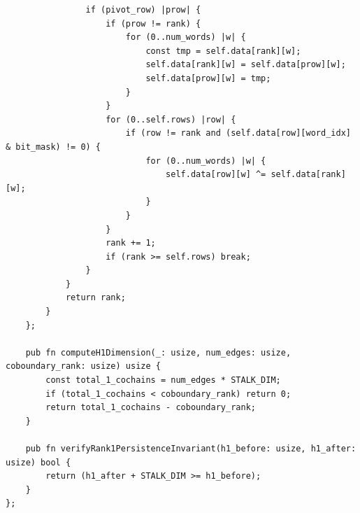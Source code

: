\documentclass[11pt,a4paper]{article}
\theoremstyle{definition}
\theoremstyle{remark}
\begin{document}
\begin{lstlisting}
                if (pivot_row) |prow| {
                    if (prow != rank) {
                        for (0..num_words) |w| {
                            const tmp = self.data[rank][w];
                            self.data[rank][w] = self.data[prow][w];
                            self.data[prow][w] = tmp;
                        }
                    }
                    for (0..self.rows) |row| {
                        if (row != rank and (self.data[row][word_idx] & bit_mask) != 0) {
                            for (0..num_words) |w| {
                                self.data[row][w] ^= self.data[rank][w];
                            }
                        }
                    }
                    rank += 1;
                    if (rank >= self.rows) break;
                }
            }
            return rank;
        }
    };

    pub fn computeH1Dimension(_: usize, num_edges: usize, coboundary_rank: usize) usize {
        const total_1_cochains = num_edges * STALK_DIM;
        if (total_1_cochains < coboundary_rank) return 0;
        return total_1_cochains - coboundary_rank;
    }

    pub fn verifyRank1PersistenceInvariant(h1_before: usize, h1_after: usize) bool {
        return (h1_after + STALK_DIM >= h1_before);
    }
};
\end{lstlisting}
\end{document}
